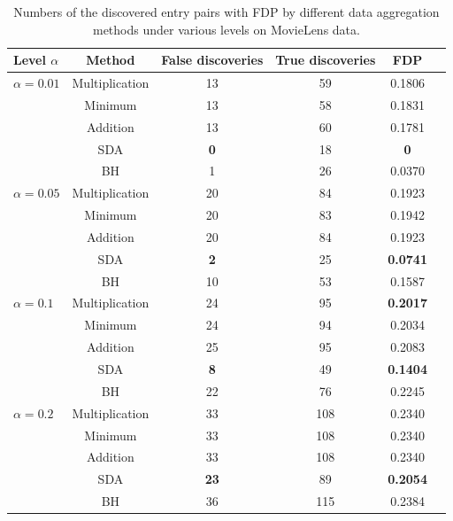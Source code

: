 \documentclass[12pt]{article}
\theoremstyle{plain}
\begin{document}
\begin{sloppypar}
\begin{table}
	\centering
	\begin{tabular}{lc|cccc}
		\hline\hline
		Level $\alpha$ & Method & False discoveries & True discoveries & FDP  \\ \hline
		$\alpha = 0.01$ & Multiplication & 13  & 59 & 0.1806  \\
		& Minimum & 13 & 58 & 0.1831 \\
		& Addition & 13 & 60 & 0.1781  \\ 
            & SDA & \textbf{0} & {18} & \textbf{0}\\ 
            & BH & 1 & 26 & 0.0370  \\ 
  \hline
  		$\alpha = 0.05$ & Multiplication & 20  & 84 & 0.1923  \\
		& Minimum & 20 & 83 & 0.1942 \\
		& Addition & 20 & 84 & 0.1923  \\ 
            & SDA & \textbf{2} & {25} & \textbf{0.0741}\\ 
            & BH & 10 & 53 & 0.1587  \\ 
  \hline
  		$\alpha = 0.1$ & Multiplication & 24 & 95 & \textbf{0.2017}  \\
		& Minimum & 24 & 94 & 0.2034   \\
		& Addition & 25 & 95 & 0.2083   \\ 
            & SDA & \textbf{8} & {49} & \textbf{0.1404} \\ 
            & BH & 22 & 76 & 0.2245  \\ 
    \hline
    $\alpha = 0.2$ & Multiplication & 33 & 108 & 0.2340  \\
		& Minimum & 33 & 108 & 0.2340   \\
		& Addition & 33 & 108 & 0.2340   \\ 
            & SDA & \textbf{23} & 89 & \textbf{0.2054} \\ 
            & BH & 36 & 115 & 0.2384 \\ 
  \hline \hline
	\end{tabular}
	\caption{Numbers of the discovered entry pairs with FDP by different data aggregation methods under various levels on MovieLens data.}
	\label{tab:tab1}
\end{table}


\end{sloppypar}
\end{document}
